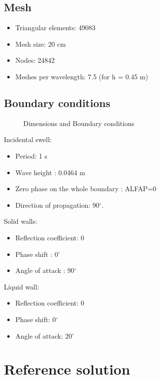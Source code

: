 \subsection{ Mesh}
\begin{itemize}
\item Triangular elements: 49083
\item Mesh size: 20 cm
\item Nodes: 24842
\item Meshes per wavelength: 7.5 (for h = 0.45 m)
\end{itemize}

\subsection{ Boundary conditions}

\begin{figure}[h]
\begin{center}
\end{center}
\caption{Dimensions and Boundary conditions}
\label{fig:bc_bosse_elipt}
\end{figure}

Incidental swell:
\begin{itemize}
\item  Period: 1 s
\item  Wave height : 0.0464 m
\item  Zero phase on the whole boundary : ALFAP=0
\item  Direction of propagation: 90$^\circ$.
\end{itemize}
Solid walls:
\begin{itemize}
  \item Reflection coefficient: 0
\item  Phase shift : 0$^\circ$
\item  Angle of attack : 90$^\circ$
\end{itemize}

Liquid wall:
\begin{itemize}
\item  Reflection coefficient: 0
\item  Phase shift: 0$^\circ$
\item  Angle of attack: 20$^\circ$
\end{itemize}

\section{Reference solution}

